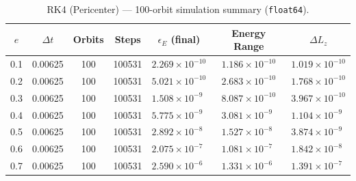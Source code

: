 \documentclass[twocolumn, 10pt]{article}
\begin{document}
\begin{table}[htbp]
\centering
\caption{RK4 (Pericenter) --- 100-orbit simulation summary (\texttt{float64}).}
\label{tab:rk4_peri}
\begin{tabular}{@{}ccccccc@{}}
\toprule
$e$ & $\Delta t$ & Orbits & Steps & $\epsilon_E$ (final) & Energy Range & $\Delta L_z$ \\
\midrule
0.1 & 0.00625 & 100 & 100531 & $2.269 \times 10^{-10}$ & $1.186 \times 10^{-10}$ & $1.019 \times 10^{-10}$ \\
0.2 & 0.00625 & 100 & 100531 & $5.021 \times 10^{-10}$ & $2.683 \times 10^{-10}$ & $1.768 \times 10^{-10}$ \\
0.3 & 0.00625 & 100 & 100531 & $1.508 \times 10^{-9\phantom{0}}$ & $8.087 \times 10^{-10}$ & $3.967 \times 10^{-10}$ \\
0.4 & 0.00625 & 100 & 100531 & $5.775 \times 10^{-9\phantom{0}}$ & $3.081 \times 10^{-9\phantom{0}}$ & $1.104 \times 10^{-9\phantom{0}}$ \\
0.5 & 0.00625 & 100 & 100531 & $2.892 \times 10^{-8\phantom{0}}$ & $1.527 \times 10^{-8\phantom{0}}$ & $3.874 \times 10^{-9\phantom{0}}$ \\
0.6 & 0.00625 & 100 & 100531 & $2.075 \times 10^{-7\phantom{0}}$ & $1.081 \times 10^{-7\phantom{0}}$ & $1.842 \times 10^{-8\phantom{0}}$ \\
0.7 & 0.00625 & 100 & 100531 & $2.590 \times 10^{-6\phantom{0}}$ & $1.331 \times 10^{-6\phantom{0}}$ & $1.391 \times 10^{-7\phantom{0}}$ \\
\bottomrule
\end{tabular}
\end{table}
\end{document}
